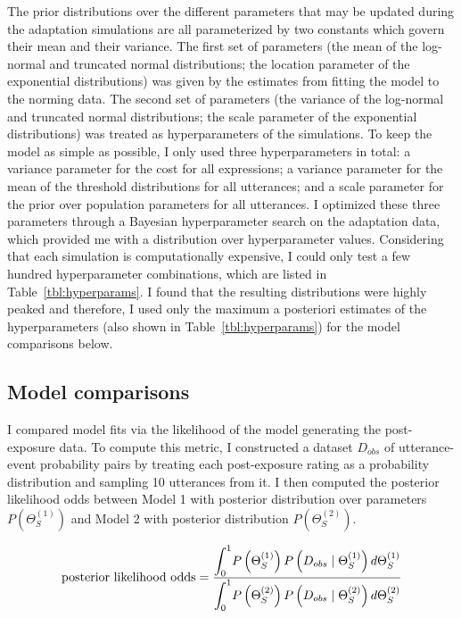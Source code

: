 The prior distributions over the different parameters that may be updated during the adaptation simulations are all parameterized by two constants which govern their mean and their variance. The first set of parameters (the mean of the log-normal and truncated normal distributions; the location parameter of the exponential distributions) was given by the estimates from fitting the model to the norming data. The second set of parameters (the variance of the log-normal and truncated normal distributions; the scale parameter of the exponential distributions) was treated as hyperparameters of the simulations. To keep the model as simple as possible, I only used three hyperparameters in total: a variance parameter for the cost for all expressions; a variance parameter for the mean of the threshold distributions for all utterances; and a scale parameter for the prior over population parameters for all utterances. I optimized these three parameters through a Bayesian hyperparameter search on the adaptation data, which provided me with a distribution over hyperparameter values. Considering that each simulation is computationally expensive, I could only test a few hundred hyperparameter combinations, which are listed in Table~\ref{tbl:hyperparams}. I found that the resulting distributions were highly peaked and therefore, I used only the maximum a posteriori estimates of the hyperparameters (also shown in Table~\ref{tbl:hyperparams}) for the model comparisons below.


\subsection{Model comparisons}

I compared model fits via the likelihood of the model generating the post-exposure data. To compute this metric, I constructed a dataset $D_{obs}$ of utterance-event probability pairs by treating each post-exposure rating as a probability distribution and sampling 10 utterances from it. I then computed the posterior likelihood odds between Model 1 with posterior distribution over parameters $P(\Theta_{S}^{(1)})$ and Model 2 with posterior distribution $P(\Theta_{S}^{(2)})$.

$$\mbox{posterior likelihood odds} = \frac{\mathlarger{\int_{0}^{1}} {P\left(\Theta_{S}^{(1)}\right) P\left(D_{obs} \mid \Theta_{S}^{(1)} \right) d   \Theta_{S}^{(1)}}}{\mathlarger{\int_0^1} P\left(\Theta_{S}^{(2)}\right) P\left(D_{obs} \mid \Theta_{S}^{(2)}\right)d   \Theta_{S}^{(2)} }$$
 
